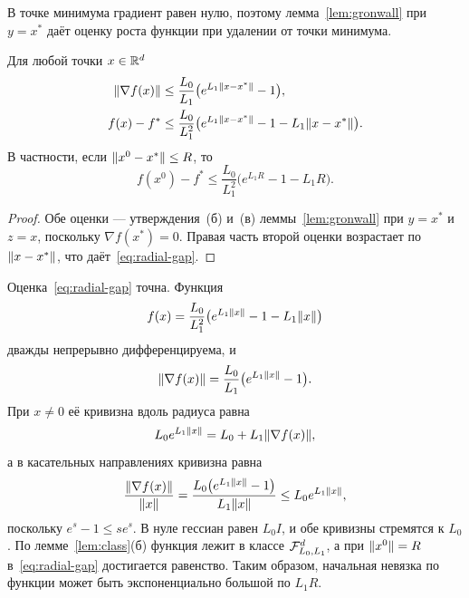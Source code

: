 В точке минимума градиент равен нулю, поэтому лемма~\ref{lem:gronwall} при $y=x^\ast$ даёт оценку роста функции при удалении от точки минимума.

\begin{lemma}\label{lem:radial}
Для любой точки $x\in\mathbb R^d$
\begin{align*}
 \|\nabla f(x)\|&\le\frac{L_0}{L_1}\bigl(e^{L_1\|x-x^\ast\|}-1\bigr),\\
 f(x)-f^\ast&\le\frac{L_0}{L_1^2}\bigl(e^{L_1\|x-x^\ast\|}-1-L_1\|x-x^\ast\|\bigr).
\end{align*}
В частности, если $\|x^0-x^\ast\|\le R$, то
\begin{equation}\label{eq:radial-gap}
 f(x^0)-f^\ast\le\frac{L_0}{L_1^2}\bigl(e^{L_1R}-1-L_1R\bigr).
\end{equation}
\end{lemma}

\begin{proof}
Обе оценки --- утверждения~(б) и~(в) леммы~\ref{lem:gronwall} при $y=x^\ast$ и $z=x$, поскольку $\nabla f(x^\ast)=0$. Правая часть второй оценки возрастает по $\|x-x^\ast\|$, что даёт~\eqref{eq:radial-gap}.
\end{proof}

Оценка~\eqref{eq:radial-gap} точна. Функция
\[
 f(x)=\frac{L_0}{L_1^2}\bigl(e^{L_1\|x\|}-1-L_1\|x\|\bigr)
\]
дважды непрерывно дифференцируема, и
\[
 \|\nabla f(x)\|=\frac{L_0}{L_1}\bigl(e^{L_1\|x\|}-1\bigr).
\]
При $x\ne0$ её кривизна вдоль радиуса равна
\[
 L_0e^{L_1\|x\|}=L_0+L_1\|\nabla f(x)\| ,
\]
а в касательных направлениях кривизна равна
\[
 \frac{\|\nabla f(x)\|}{\|x\|}=\frac{L_0\bigl(e^{L_1\|x\|}-1\bigr)}{L_1\|x\|}\le L_0e^{L_1\|x\|} ,
\]
поскольку $e^s-1\le se^s$. В нуле гессиан равен $L_0I$, и обе кривизны стремятся к $L_0$. По лемме~\ref{lem:class}(б) функция лежит в классе $\mathcal F_{L_0,L_1}^d$, а при $\|x^0\|=R$ в~\eqref{eq:radial-gap} достигается равенство. Таким образом, начальная невязка по функции может быть экспоненциально большой по $L_1R$.

